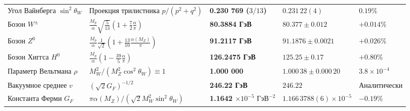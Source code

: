 \documentclass[11pt,a4paper]{article}
\theoremstyle{definition}
\theoremstyle{remark}
\begin{document}
\begin{xltabular}{\textwidth}{>{\raggedright\arraybackslash}p{3.2cm} X >{\centering\arraybackslash}p{2.7cm} >{\centering\arraybackslash}p{3.0cm} >{\raggedleft\arraybackslash}p{2.1cm}}
 \\
\midrule
Угол Вайнберга $\sin^2\theta_W$ & Проекция трилистника $p/(p^2+q^2)$ & \textbf{0.230 769 ($3/13$)} & $0.231\,22(4)$ & $0.19\%$ \\
Бозон $W^\pm$ & $\frac{M_p}{\alpha}\sqrt{\frac{5}{13}}(1 + \frac{7}{2}\frac{\alpha}{\pi})$ & \textbf{80.3884 ГэВ} & $80.377 \pm 0.012$ & $+0.014\%$ \\
Бозон $Z^0$ & $\frac{M_p}{\alpha}\frac{1}{\sqrt{2}}(1 + \frac{13}{10}\frac{\alpha(M_Z)}{\pi})$ & \textbf{91.2117 ГэВ} & $91.1876 \pm 0.0021$ & $+0.026\%$ \\
Бозон Хиггса $H^0$ & $\frac{M_p}{\alpha}(1 - \frac{39}{5}\frac{\alpha}{\pi})$ & \textbf{126.2475 ГэВ} & $125.25 \pm 0.17$ & $+0.80\%$ \\
Параметр Вельтмана $\rho$ & $M_W^2 / (M_Z^2 \cos^2\theta_W) \equiv 1$ & \textbf{1.000 000} & $1.000\,38 \pm 0.000\,20$ & $3.8 \times 10^{-4}$ \\
Вакуумное среднее $v$ & $(\sqrt{2} G_F)^{-1/2}$ & \textbf{246.22 ГэВ} & $246.22$ & Аналитически \\
Константа Ферми $G_F$ & $\pi\alpha(M_Z) / (\sqrt{2} M_W^2 \sin^2\theta_W)$ & \textbf{1.1642 $\times 10^{-5}\text{ ГэВ}^{-2}$} & $1.166\,3788(6) \times 10^{-5}$ & $-0.19\%$ \\
\midrule


\end{xltabular}
\end{document}
